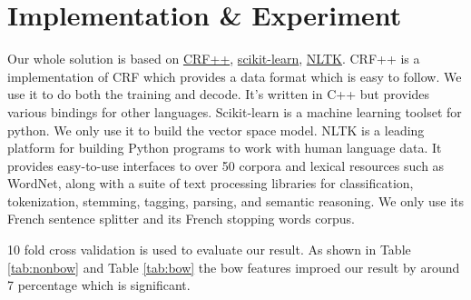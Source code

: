 \documentclass[a4paper]{article}
\begin{document}
\section{Implementation \& Experiment}
Our whole solution is based on \href{http://crfpp.googlecode.com/svn/trunk/doc/index.html}{CRF++}, \href{http://scikit-learn.org/stable/}{scikit-learn}, \href{http://nltk.org/}{NLTK}. CRF++ is a implementation of CRF which provides a data format which is easy to follow. We use it to do both the training and decode. It's written in C++ but provides various bindings for other languages. Scikit-learn is a machine learning toolset for python. We only use it to build the vector space model. NLTK is a leading platform for building Python programs to work with human language data. It provides easy-to-use interfaces to over 50 corpora and lexical resources such as WordNet, along with a suite of text processing libraries for classification, tokenization, stemming, tagging, parsing, and semantic reasoning. We only use its French sentence splitter and its French stopping words corpus.

10 fold cross validation is used to evaluate our result. As shown in Table \ref{tab:nonbow} and Table \ref{tab:bow} the bow features improed our result by around 7 percentage which is significant.
\end{document}
